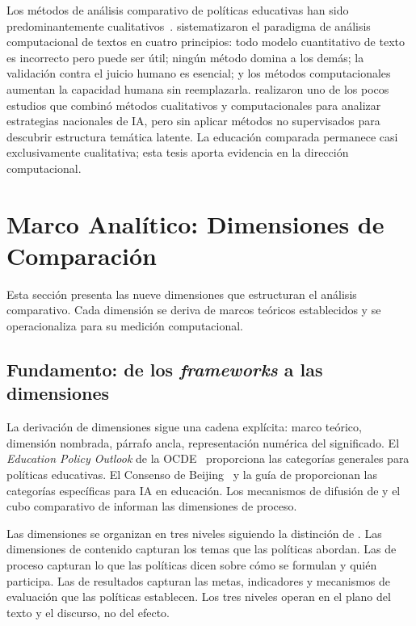 Los métodos de análisis comparativo de políticas educativas han sido predominantemente cualitativos~\citep{bray2014comparative}. \citet{grimmer2022text} sistematizaron el paradigma de análisis computacional de textos en cuatro principios: todo modelo cuantitativo de texto es incorrecto pero puede ser útil; ningún método domina a los demás; la validación contra el juicio humano es esencial; y los métodos computacionales aumentan la capacidad humana sin reemplazarla. \citet{fatima2020aipolicy} realizaron uno de los pocos estudios que combinó métodos cualitativos y computacionales para analizar estrategias nacionales de IA, pero sin aplicar métodos no supervisados para descubrir estructura temática latente. La educación comparada permanece casi exclusivamente cualitativa; esta tesis aporta evidencia en la dirección computacional.


\section{Marco Analítico: Dimensiones de Comparación}
\label{sec:marco-analitico}

Esta sección presenta las nueve dimensiones que estructuran el análisis comparativo. Cada dimensión se deriva de marcos teóricos establecidos y se operacionaliza para su medición computacional.


\subsection{Fundamento: de los \textit{frameworks} a las dimensiones}

La derivación de dimensiones sigue una cadena explícita: marco teórico, dimensión nombrada, párrafo ancla, representación numérica del significado. El \textit{Education Policy Outlook} de la OCDE~\citep{oecd2021epo} proporciona las categorías generales para políticas educativas. El Consenso de Beijing~\citep{unesco2019beijing} y la guía de \citet{miao2021guidance} proporcionan las categorías específicas para IA en educación. Los mecanismos de difusión de \citet{shipan2012diffusion} y el cubo comparativo de \citet{bray1995levels} informan las dimensiones de proceso.

Las dimensiones se organizan en tres niveles siguiendo la distinción de \citet{rizvi2010globalizing}. Las dimensiones de contenido capturan los temas que las políticas abordan. Las de proceso capturan lo que las políticas dicen sobre cómo se formulan y quién participa. Las de resultados capturan las metas, indicadores y mecanismos de evaluación que las políticas establecen. Los tres niveles operan en el plano del texto y el discurso, no del efecto.


